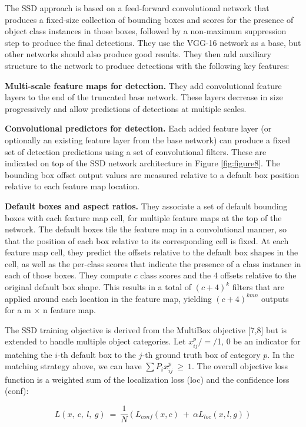 \documentclass{ieeeaccess}
\begin{document}
The SSD approach is based on a feed-forward convolutional network that produces a fixed-size collection of bounding boxes and scores for the presence of object class
instances in those boxes, followed by a non-maximum suppression step to produce the final detections. They use the VGG-16 network as a base, but other networks should also produce good results. They then add auxiliary structure to the network to produce detections with the following key features:

\textbf{Multi-scale feature maps for detection.} They add convolutional feature layers to the end of the truncated base network. These layers decrease in size progressively and allow predictions of detections at multiple scales.

\textbf{Convolutional predictors for detection.} Each added feature layer (or optionally an existing feature layer from the base network) can produce a fixed set of detection predictions using a set of convolutional filters. These are indicated on top of the SSD network architecture in Figure \ref{fig:figure8}. The bounding box offset output values are measured relative to a default box position relative to each feature map location.

\textbf{Default boxes and aspect ratios.} They associate a set of default bounding boxes with each feature map cell, for multiple feature maps at the top of the network. The default boxes tile the feature map in a convolutional manner, so that the position of each box relative to its corresponding cell is fixed. At each feature map cell, they predict the offsets relative to the default box shapes in the cell, as well as the per-class scores that indicate the presence of a class instance in each of those boxes. They compute $c$ class scores and the 4 offsets relative to the original default box shape. This results in a total of $(c + 4)^k$ filters that are applied around each location in the feature map, yielding $(c + 4)^{kmn}$ outputs for a m × n feature map.

The SSD training objective is derived from the MultiBox objective [7,8] but is extended to handle multiple object categories. Let $x^{p}_{ij} / = / ${1, 0} be an indicator for matching the $i$-th default box to the $j$-th ground truth box of category $p$. In the matching strategy above, we can have $\sum P_i x^{p}_{ij} \ \geq \ 1$. The overall objective loss function is a weighted sum of the localization loss (loc) and the confidence loss (conf):

\begin{equation}
	\label{equation6}
	 L(x, \ c, \ l, \ g) \ = \ \frac{1}{N} (L_{conf}(x, c) \ + \ \alpha L_{loc}(x,l,g))
\end{equation}
\end{document}
